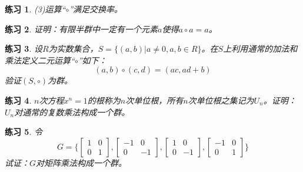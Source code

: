 \documentclass{article}
\newtheorem{Exercise}{练习}
\begin{document}
\begin{CJK*}{UTF8}{gbsn}
\begin{Exercise}
  (3)运算“$\circ$”满足交换率。
\end{Exercise}


\begin{Exercise}
  证明：有限半群中一定有一个元素$a$使得$a\circ a=a$。
\end{Exercise}


\begin{Exercise}
  设$R$为实数集合，$S=\{(a,b)|a\neq 0,a,b\in R\}$。在$S$上利用通常的加法和乘法定义二元运算“$\circ$”如下：
  \[(a,b)\circ (c,d) = (ac, ad + b)\]
  验证$(S,\circ)$为群。
\end{Exercise}

\begin{Exercise}
  $n$次方程$x^n=1$的根称为$n$次单位根，所有$n$次单位根之集记为$U_n$。证明：$U_n$对通常的复数乘法构成一个群。
\end{Exercise}


\begin{Exercise}
 令
 \[G=\bigg\{\begin{bmatrix}
  1&0\\0&1
 \end{bmatrix},
 \begin{bmatrix}
  -1&0\\0&-1
 \end{bmatrix},
 \begin{bmatrix}
  1&0\\0&-1
 \end{bmatrix},
 \begin{bmatrix}
  -1&0\\0&1
 \end{bmatrix}\bigg\}\] 
 试证：$G$对矩阵乘法构成一个群。
\end{Exercise}




\end{CJK*}
\end{document}
